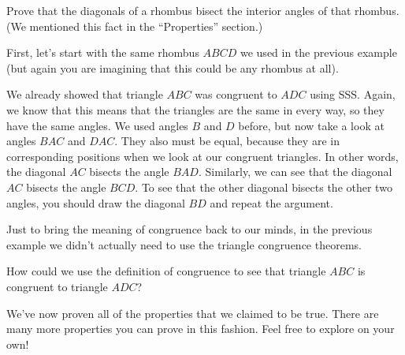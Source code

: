 \documentclass{ximera}
\begin{document}
\begin{example}
Prove that the diagonals of a rhombus bisect the interior angles of that rhombus. (We mentioned this fact in the ``Properties'' section.)

First, let's start with the same rhombus $ABCD$ we used in the previous example (but again you are imagining that this could be any rhombus at all).
\begin{center}\end{center}
We already showed that triangle $ABC$ was congruent to $ADC$ using SSS. Again, we know that this means that the triangles are the same in every way, so they have the same angles. We used angles $B$ and $D$ before, but now take a look at angles $BAC$ and $DAC$. They also must be equal, because they are in corresponding positions when we look at our congruent triangles. In other words, the diagonal $AC$ bisects the angle $BAD$. Similarly, we can see that the diagonal $AC$ bisects the angle $BCD$. To see that the other diagonal bisects the other two angles, you should draw the diagonal $BD$ and repeat the argument.

\end{example}

Just to bring the meaning of congruence back to our minds, in the previous example we didn't actually need to use the triangle congruence theorems.
\begin{question}
How could we use the definition of congruence to see that triangle $ABC$ is congruent to triangle $ADC$?
\begin{multipleChoice}
\end{multipleChoice}
\end{question}

We've now proven all of the properties that we claimed to be true. There are many more properties you can prove in this fashion. Feel free to explore on your own!
\end{document}
